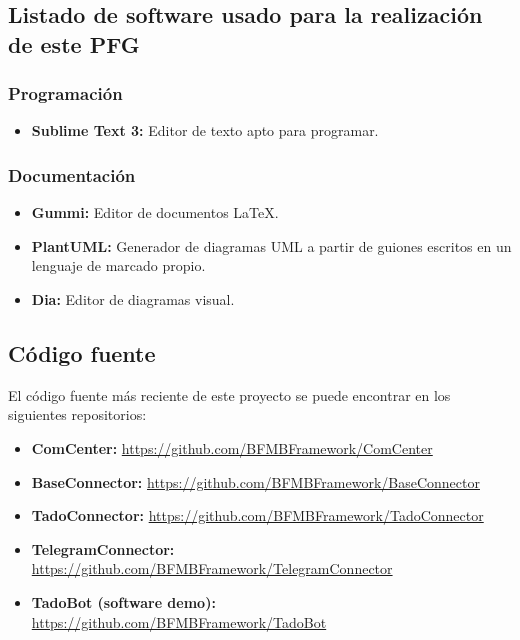 \documentclass[spanish,12pt, a4paper, twoside]{paper}
\begin{document}
\subsection{Listado de software usado para la realización de este PFG}

\subsubsection{Programación}

\begin{itemize}
\item\textbf{Sublime Text 3:} Editor de texto apto para programar.
\end{itemize}

\subsubsection{Documentación}

\begin{itemize}
\item\textbf{Gummi:} Editor de documentos \LaTeX.
\item\textbf{PlantUML:} Generador de diagramas UML a partir de guiones escritos en un lenguaje de marcado propio.
\item\textbf{Dia:} Editor de diagramas visual.
\end{itemize}

\subsection{Código fuente}

El código fuente más reciente de este proyecto se puede encontrar en los siguientes repositorios:

\begin{itemize}
\item\textbf{ComCenter:} \url{https://github.com/BFMBFramework/ComCenter}
\item\textbf{BaseConnector:} \url{https://github.com/BFMBFramework/BaseConnector}
\item\textbf{TadoConnector:} \url{https://github.com/BFMBFramework/TadoConnector}
\item\textbf{TelegramConnector:} \url{https://github.com/BFMBFramework/TelegramConnector}
\item\textbf{TadoBot (software demo):} \url{https://github.com/BFMBFramework/TadoBot}
\end{itemize}
\end{document}
